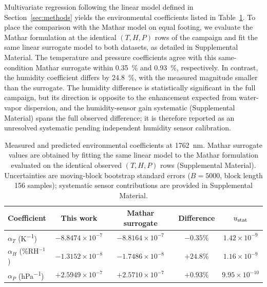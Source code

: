 \documentclass[aps,prapplied,reprint,groupedaddress,twocolumn,superscriptaddress,linenumbers]{revtex4-2}
\begin{document}
Multivariate regression following the linear model defined in Section~\ref{sec:methods} yields the environmental coefficients listed in Table~\ref{tab:coefficients}. To place the comparison with the Mathar model on equal footing, we evaluate the Mathar formulation at the identical $(T,H,P)$ rows of the campaign and fit the same linear surrogate model to both datasets, as detailed in Supplemental Material. The temperature and pressure coefficients agree with this same-condition Mathar surrogate within \SI{0.35}{\percent} and \SI{0.93}{\percent}, respectively. In contrast, the humidity coefficient differs by \SI{24.8}{\percent}, with the measured magnitude smaller than the surrogate. The humidity difference is statistically significant in the full campaign, but its direction is opposite to the enhancement expected from water-vapor dispersion, and the humidity-sensor gain systematic (Supplemental Material) spans the full observed difference; it is therefore reported as an unresolved systematic pending independent humidity sensor calibration.

\begin{table}[htbp]
\centering
\caption{Measured and predicted environmental coefficients at
         \SI{1762}{\nano\meter}. Mathar surrogate values are obtained
         by fitting the same linear model to the Mathar formulation
         evaluated on the identical observed $(T,H,P)$ rows
         (Supplemental Material). Uncertainties are moving-block
         bootstrap standard errors ($B = 5000$, block length 156
         samples); systematic sensor contributions are provided in
         Supplemental Material.}
\label{tab:coefficients}
\begin{tabular}{lcccc}
\hline
Coefficient & This work & Mathar surrogate & Difference & $u_{\rm stat}$ \\
\hline
$\alpha_T$ (\si{K^{-1}})      & $-8.8474\times 10^{-7}$ & $-8.8164\times 10^{-7}$ & $-0.35\%$ & $1.42\times10^{-9}$ \\
$\alpha_H$ (\%RH$^{-1}$)      & $-1.3152\times 10^{-8}$ & $-1.7486\times 10^{-8}$ & $+24.8\%$ & $1.16\times10^{-9}$ \\
$\alpha_P$ (\si{hPa^{-1}})    & $+2.5949\times 10^{-7}$ & $+2.5710\times 10^{-7}$ & $+0.93\%$ & $9.95\times10^{-10}$ \\
\hline
\end{tabular}
\end{table}
\end{document}
